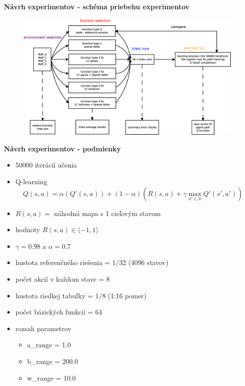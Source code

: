 \documentclass[xcolor=dvipsnames]{beamer}
\begin{document}
\begin{frame}{\bf Návrh experimentov - schéma priebehu experimentov}

\begin{figure}[!htb]
\centering
\includegraphics[scale=.22]{../diagrams/experiment_map_q_learning.eps}
\end{figure}

\end{frame}





\begin{frame}{\bf Návrh experimentov - podmienky}

\begin{itemize}
\item 50000 iterácií učenia
\item Q-learning
\begin{equation} \label{eu_eqn}
Q(s,a) = \alpha(Q'(s,a)) + (1 - \alpha)(R(s,a) + \gamma \max_{a' \in \mathbb{A}} Q'(s', a')) \nonumber
\end{equation}

\item $R(s, a) =$ náhodná mapa s 1 cieľovým stavom
\item hodnoty $R(s, a) \in \langle -1, 1 \rangle$
\item $\gamma = 0.98$ a $\alpha = 0.7$

\item hustota referenčného riešenia = 1/32  (4096 stavov)
\item počet akcií v každom stave = 8
\item hustota riedkej tabuľky = 1/8  (1:16 pomer)
\item počet bázických funkcií = 64
\item rozsah parametrov
    \begin{itemize}
      \item a\_range = 1.0
      \item b\_range = 200.0
      \item w\_range = 10.0
    \end{itemize}
\end{itemize}

\end{frame}
\end{document}
